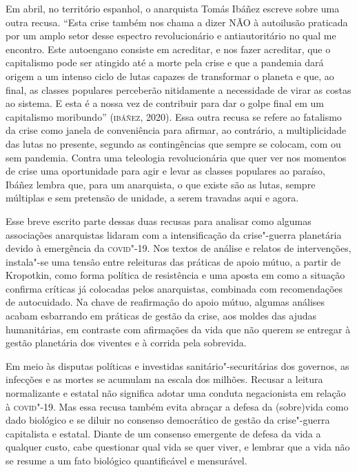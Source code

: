 Em abril, no território espanhol, o anarquista Tomás Ibáñez escreve
sobre uma outra recusa. ``Esta crise também nos chama a dizer NÃO à
autoilusão praticada por um amplo setor desse espectro revolucionário e
antiautoritário no qual me encontro. Este autoengano consiste em
acreditar, e nos fazer acreditar, que o capitalismo pode ser atingido
até a morte pela crise e que a pandemia dará origem a um intenso ciclo
de lutas capazes de transformar o planeta e que, ao final, as classes
populares perceberão nitidamente a necessidade de virar as costas ao
sistema. E esta é a nossa vez de contribuir para dar o golpe final em um
capitalismo moribundo'' (\textsc{ibáñez}, 2020). Essa outra recusa se refere ao
fatalismo da crise como janela de conveniência para afirmar, ao
contrário, a multiplicidade das lutas no presente, segundo as
contingências que sempre se colocam, com ou sem pandemia. Contra uma
teleologia revolucionária que quer ver nos momentos de crise uma
oportunidade para agir e levar as classes populares ao paraíso, Ibáñez
lembra que, para um anarquista, o que existe são as lutas, sempre
múltiplas e sem pretensão de unidade, a serem travadas aqui e agora.

Esse breve escrito parte dessas duas recusas para analisar como algumas
associações anarquistas lidaram com a intensificação da crise"-guerra
planetária devido à emergência da \textsc{covid}"-19. Nos textos de análise e
relatos de intervenções, instala"-se uma tensão entre releituras das
práticas de apoio mútuo, a partir de Kropotkin, como forma política de
resistência e uma aposta em como a situação confirma críticas já
colocadas pelos anarquistas, combinada com recomendações de autocuidado.
Na chave de reafirmação do apoio mútuo, algumas análises acabam
esbarrando em práticas de gestão da crise, aos moldes das ajudas
humanitárias, em contraste com afirmações da vida que não querem se
entregar à gestão planetária dos viventes e à corrida pela sobrevida.

Em meio às disputas políticas e investidas sanitário"-securitárias dos
governos, as infecções e as mortes se acumulam na escala dos milhões.
Recusar a leitura normalizante e estatal não significa adotar uma
conduta negacionista em relação à \textsc{covid}"-19. Mas essa recusa também evita
abraçar a defesa da (sobre)vida como dado biológico e se diluir no
consenso democrático de gestão da crise"-guerra capitalista e estatal.
Diante de um consenso emergente de defesa da vida a qualquer custo, cabe
questionar qual vida se quer viver, e lembrar que a vida não se resume a
um fato biológico quantificável e mensurável.

